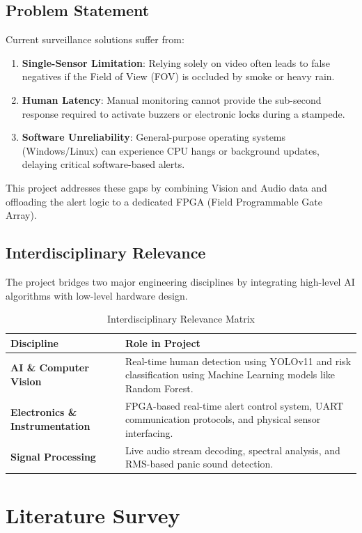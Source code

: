 \documentclass[12pt,oneside,a4paper]{book}
\begin{document}
\section{Problem Statement}
Current surveillance solutions suffer from:
\begin{enumerate}
    \item \textbf{Single-Sensor Limitation}: Relying solely on video often leads to false negatives if the Field of View (FOV) is occluded by smoke or heavy rain.
    \item \textbf{Human Latency}: Manual monitoring cannot provide the sub-second response required to activate buzzers or electronic locks during a stampede.
    \item \textbf{Software Unreliability}: General-purpose operating systems (Windows/Linux) can experience CPU hangs or background updates, delaying critical software-based alerts.
\end{enumerate}
This project addresses these gaps by combining Vision and Audio data and offloading the alert logic to a dedicated FPGA (Field Programmable Gate Array).

\section{Interdisciplinary Relevance}
The project bridges two major engineering disciplines by integrating high-level AI algorithms with low-level hardware design.

\begin{table}[H]
\centering
\begin{tabular}{lp{10cm}}
\toprule
\textbf{Discipline} & \textbf{Role in Project} \\
\midrule
\textbf{AI \& Computer Vision} & Real-time human detection using YOLOv11 and risk classification using Machine Learning models like Random Forest. \\
\textbf{Electronics \& Instrumentation} & FPGA-based real-time alert control system, UART communication protocols, and physical sensor interfacing. \\
\textbf{Signal Processing} & Live audio stream decoding, spectral analysis, and RMS-based panic sound detection. \\
\bottomrule
\end{tabular}
\caption{Interdisciplinary Relevance Matrix}
\label{tab:relevance}
\end{table}

\chapter{Literature Survey}
\end{document}
